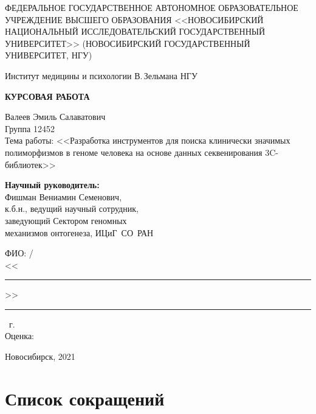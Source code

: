 \documentclass[a4paper,14pt]{extarticle}
\begin{document}
\begin{titlepage}
	\centering
	{\par\small{ФЕДЕРАЛЬНОЕ ГОСУДАРСТВЕННОЕ АВТОНОМНОЕ ОБРАЗОВАТЕЛЬНОЕ УЧРЕЖДЕНИЕ ВЫСШЕГО ОБРАЗОВАНИЯ <<НОВОСИБИРСКИЙ НАЦИОНАЛЬНЫЙ ИССЛЕДОВАТЕЛЬСКИЙ ГОСУДАРСТВЕННЫЙ УНИВЕРСИТЕТ>> (НОВОСИБИРСКИЙ ГОСУДАРСТВЕННЫЙ УНИВЕРСИТЕТ, НГУ)}}
	{\par\small{Институт медицины и психологии В.\,Зельмана НГУ}}

	\vspace{4cm}

	{\par\LARGE\textbf{КУРСОВАЯ РАБОТА}}

	\vspace{0.5cm}

	Валеев Эмиль Салаватович\\
	Группа 12452\\
	Тема работы: <<Разработка инструментов для поиска клинически значимых полиморфизмов в геноме человека на основе данных секвенирования 3C\hyp{}библиотек>>

	\vfill

	\hfill
	\begin{minipage}{0.57\textwidth}

		\textbf{Научный руководитель:}\\
		Фишман Вениамин Семенович,\\
		к.б.н., ведущий научный сотрудник,\\
		заведующий Сектором геномных\\
		механизмов онтогенеза, ИЦиГ~СО~РАН

		\vspace{1cm}

		ФИО: \hrulefill/\hrulefill\\
		<<\rule{2em}{0.4pt}>>\rule{2em}{0.4pt}~г.\\
		Оценка: \hrulefill\\
	\end{minipage}

	\vfill

	{\centering\small{Новосибирск, 2021}}
\end{titlepage}

\tableofcontents
\newpage

\section*{Список сокращений}
\end{document}
